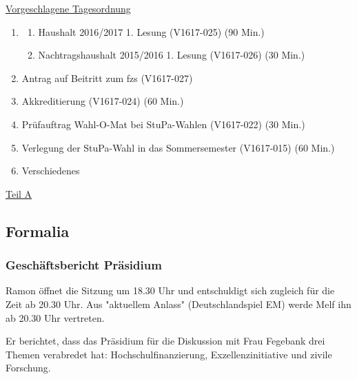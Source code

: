 \documentclass[ngerman,headheight=70pt]{scrartcl}
\begin{document}
    \newpage
    \underline{Vorgeschlagene Tagesordnung}
    \begin{enumerate}[label={\textbf{Top \theenumi}},leftmargin=*]
        \item
            \begin{enumerate}
                \item Haushalt 2016/2017 1. Lesung (V1617-025) (90 Min.)
                \item Nachtragshaushalt 2015/2016 1. Lesung (V1617-026) (30 Min.)
            \end{enumerate}
        \item Antrag auf Beitritt zum fzs (V1617-027)
        \item Akkreditierung (V1617-024) (60 Min.)
        \item Prüfauftrag Wahl-O-Mat bei StuPa-Wahlen (V1617-022) (30 Min.)
        \item Verlegung der StuPa-Wahl in das Sommersemester (V1617-015) (60 Min.)
        \item Verschiedenes
    \end{enumerate}

    \newpage


    {\Large \underline{Teil A}}

    \subsection{Formalia}

    \subsubsection{Geschäftsbericht Präsidium}

    Ramon öffnet die Sitzung um 18.30 Uhr und entschuldigt sich zugleich für die
    Zeit ab 20.30 Uhr. Aus "aktuellem Anlass" (Deutschlandspiel EM) werde Melf
    ihn ab 20.30 Uhr vertreten.

    Er berichtet, dass das Präsidium für die Diskussion mit Frau Fegebank drei
    Themen verabredet hat: Hochschulfinanzierung, Exzellenzinitiative und zivile
    Forschung.
\end{document}
